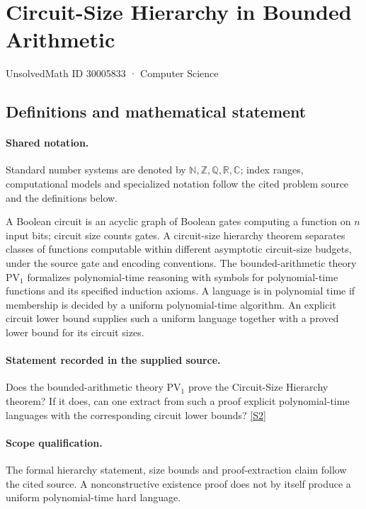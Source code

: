 \documentclass[11pt]{article}
\newcommand{\sref}[2]{\hyperlink{source:#1:#2}{[S#2]}}
\begin{document}
\setcounter{section}{30005832}
\section{Circuit-Size Hierarchy in Bounded Arithmetic}\label{30005833}
{\small\sffamily UnsolvedMath ID 30005833 · Computer Science}
\subsection{Definitions and mathematical statement}

\paragraph{Shared notation.}Standard number systems are denoted by $\mathbb N,\mathbb Z,\mathbb Q,\mathbb R,\mathbb C$; index ranges, computational models and specialized notation follow the cited problem source and the definitions below.


A Boolean circuit is an acyclic graph of Boolean gates computing a function on $n$ input bits; circuit size counts gates. A circuit-size hierarchy theorem separates classes of functions computable within different asymptotic circuit-size budgets, under the source gate and encoding conventions. The bounded-arithmetic theory $\mathrm{PV}_1$ formalizes polynomial-time reasoning with symbols for polynomial-time functions and its specified induction axioms. A language is in polynomial time if membership is decided by a uniform polynomial-time algorithm. An explicit circuit lower bound supplies such a uniform language together with a proved lower bound for its circuit sizes.
\paragraph{Statement recorded in the supplied source.}
Does the bounded-arithmetic theory $\mathrm{PV}_1$ prove the Circuit-Size Hierarchy theorem? If it does, can one extract from such a proof explicit polynomial-time languages with the corresponding circuit lower bounds? \sref{30005833}{2}
\paragraph{Scope qualification.}
The formal hierarchy statement, size bounds and proof-extraction claim follow the cited source. A nonconstructive existence proof does not by itself produce a uniform polynomial-time hard language.
\end{document}

